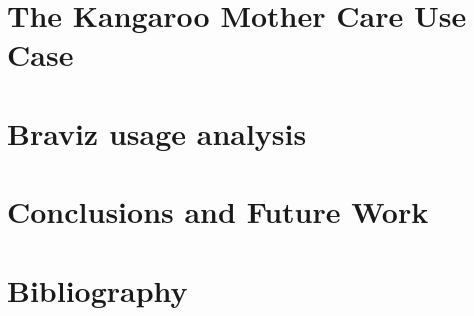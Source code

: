 \documentclass[12pt]{report}
\begin{document}
\chapter{The Kangaroo Mother Care Use Case}
\label{chap_kmc}


\chapter{Braviz usage analysis}
\label{chap_analysis}


\chapter{Conclusions and Future Work}
\label{chap_conclusions}


\chapter*{Bibliography}
\printbibliography

\appendix


%
\end{document}
